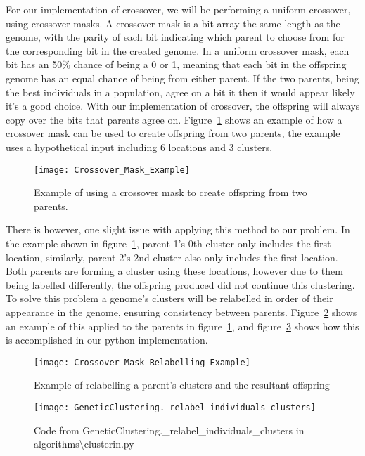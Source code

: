 \noindent
For our implementation of crossover, we will be performing a uniform crossover, using crossover masks.
A crossover mask is a bit array the same length as the genome, with the parity of each bit indicating which parent
to choose from for the corresponding bit in the created genome.
In a uniform crossover mask, each bit has an 50\% chance of being a 0 or 1, meaning that each bit in the offspring
genome has an equal chance of being from either parent\parencite{syswerda1989uniform}.
If the two parents, being the best individuals in a population, agree on a bit it then it would appear likely it's a
good choice.
With our implementation of crossover, the offspring will always copy over the bits that parents agree on.
Figure~\ref{fig:Crossover_Mask_Example} shows an example of how a crossover mask can be used to create offspring from
two parents, the example uses a hypothetical input including 6 locations and 3 clusters.
\begin{figure}[H]
    \centering
    \texttt{[image: Crossover\_Mask\_Example]}
    \caption{Example of using a crossover mask to create offspring from two parents.}
    \label{fig:Crossover_Mask_Example}
\end{figure}

\noindent
There is however, one slight issue with applying this method to our problem.
In the example shown in figure~\ref{fig:Crossover_Mask_Example}, parent 1's 0th cluster only includes the first
location, similarly, parent 2's 2nd cluster also only includes the first location.
Both parents are forming a cluster using these locations, however due to them being labelled differently, the
offspring produced did not continue this clustering.
To solve this problem a genome's clusters will be relabelled in order of their appearance in the genome, ensuring
consistency between parents.
Figure~\ref{fig:Crossover_Mask_Relabelling_Example} shows an example of this applied to the parents in figure~\ref{fig:Crossover_Mask_Example},
and figure~\ref{fig:GeneticClustering._relabel_individuals_clusters} shows how this is accomplished in our python
implementation.
\begin{figure}[H]
    \centering
    \texttt{[image: Crossover\_Mask\_Relabelling\_Example]}
    \caption{Example of relabelling a parent's clusters and the resultant offspring}
    \label{fig:Crossover_Mask_Relabelling_Example}
\end{figure}
\begin{figure}[H]
    \centering
    \texttt{[image: GeneticClustering.\_relabel\_individuals\_clusters]}
    \caption{Code from GeneticClustering.\_relabel\_individuals\_clusters in algorithms\textbackslash clusterin.py}
    \label{fig:GeneticClustering._relabel_individuals_clusters}
\end{figure}

